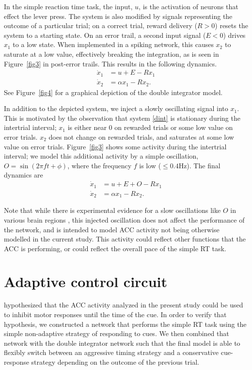 \documentclass[11pt]{article}
\begin{document}
In the simple reaction time task,
the input, $u$, is the activation of neurons
that effect the lever press.
The system is also modified by signals
representing the outcome of a particular trial;
on a correct trial, reward delivery ($R > 0$)
resets the system to a starting state.
On an error trail, a second input signal ($E < 0$)
drives $x_1$ to a low state.
When implemented in a spiking network,
this causes $x_2$ to saturate at a low value,
effectively breaking the integration,
as is seen in Figure~\ref{fig3} in post-error trails.
This results in the following dynamics.
\begin{align} \label{dint}
  \dot{x}_1 &= u + E - R x_1 \nonumber \\
  \dot{x}_2 &= \alpha x_1 - R x_2.
\end{align}
See Figure~\ref{fig4} for a graphical
depiction of the double integrator model.

In addition to the depicted system,
we inject a slowly oscillating signal into $x_1$.
This is motivated by the observation
that system \eqref{dint} is stationary
during the intertrial interval;
$x_1$ is either near 0 on rewarded trials
or some low value on error trials.
$x_2$ does not change on rewarded trials,
and saturates at some low value on error trials.
Figure~\ref{fig3} shows some activity during
the intertrial interval;
we model this additional activity
by a simple oscillation, $O = \sin(2 \pi f t + \phi)$,
where the frequency $f$ is low ($\le 0.4$Hz).
The final dynamics are
\begin{align} \label{dint-full}
  \dot{x}_1 &= u + E + O - R x_1 \nonumber \\
  \dot{x}_2 &= \alpha x_1 - R x_2.
\end{align}

Note that while there is experimental evidence for
a slow oscillations like $O$ in various brain regions
\citep{Buzsaki2004}, this injected oscillation
does not affect the performance of the network,
and is intended to model ACC activity
not being otherwise modelled in the current study.
This activity could reflect
other functions that the ACC is performing,
or could reflect the overall pace
of the simple RT task.

\section{Adaptive control circuit}

\citet{Narayanan2009} hypothesized
that the ACC activity analyzed in the present study
could be used to inhibit motor responses
until the time of the cue.
In order to verify that hypothesis,
we constructed a network that
performs the simple RT task
using the simple non-adaptive strategy
of responding to cues.
We then combined that network
with the double integrator network
such that the final model
is able to flexibly switch between
an aggressive timing strategy
and a conservative cue-response strategy
depending on the outcome of the previous trial.
\end{document}

